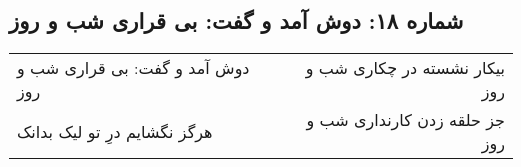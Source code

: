 \begin{center}
\section*{شماره ۱۸: دوش آمد و گفت: بی قراری شب و روز}
\label{sec:018}
\begin{longtable}{l p{0.5cm} r}
دوش آمد و گفت: بی قراری شب و روز
&&
بیکار نشسته در چکاری شب و روز
\\
هرگز نگشایم درِ تو لیک بدانک
&&
جز حلقه زدن کارنداری شب و روز
\\
\end{longtable}
\end{center}
